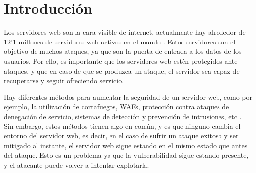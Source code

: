 \chapter{Introducción}
Los servidores web son la cara visible de internet, actualmente hay alrededor de 12'1 millones de servidores web activos en el mundo \cite{netcraft-agosto23}. Estos servidores son el objetivo de muchos ataques, ya que son la puerta de entrada a los datos de los usuarios. Por ello, es importante que los servidores web estén protegidos ante ataques, y que en caso de que se produzca un ataque, el servidor sea capaz de recuperarse y seguir ofreciendo servicio.

Hay diferentes métodos para aumentar la seguridad de un servidor web, como por ejemplo, la utilización de cortafuegos, WAFs, protección contra ataques de denegación de servicio, sistemas de detección y prevención de intrusiones, etc \cite{medium-attacks}. Sin embargo, estos métodos tienen algo en común, y es que ninguno cambia el entorno del servidor web, es decir, en el caso de sufrir un ataque exitoso y ser mitigado al instante, el servidor web sigue estando en el mismo estado que antes del ataque. Esto es un problema ya que la vulnerabilidad sigue estando presente, y el atacante puede volver a intentar explotarla.
